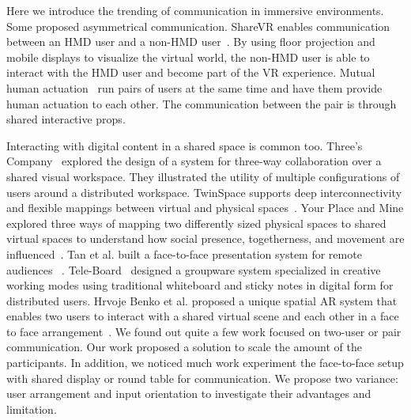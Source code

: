 \documentclass{sigchi}
\begin{document}
Here we introduce the trending of communication in immersive environments. Some proposed asymmetrical communication. ShareVR enables communication between an HMD user and a non-HMD user~\cite{gugenheimer2017sharevr}. By using floor projection and mobile displays to visualize the virtual world, the non-HMD user is able to interact with the HMD user and become part of the VR experience. Mutual human actuation~\cite{cheng2017mutual} run pairs of users at the same time and have them provide human actuation to each other. The communication between the pair is through shared interactive props.

Interacting with digital content in a shared space is common too. Three's Company~\cite{tang2010three} explored the design of a system for three-way collaboration over a shared visual workspace. They illustrated the utility of multiple configurations of users around a distributed workspace. TwinSpace supports deep interconnectivity and flexible mappings between virtual and physical spaces~\cite{reilly2010twinspace}. Your Place and Mine explored three ways of mapping two differently sized physical spaces to shared virtual spaces to understand how social presence, togetherness, and movement are influenced~\cite{sra2018}. Tan et al. built a face-to-face presentation system for remote audiences ~\cite{gazeAwareness}. Tele-Board~\cite{gumienny2011tele} designed a groupware system specialized in creative working modes using traditional whiteboard and sticky notes in digital form for distributed users. Hrvoje Benko et al. proposed a unique spatial AR system that enables two users to interact with a shared virtual scene and each other in a face to face arrangement~\cite{benko2014dyadic}. We found out quite a few work focused on two-user or pair communication. Our work proposed a solution to scale the amount of the participants. In addition, we noticed much work experiment the face-to-face setup with shared display or round table for communication. We propose two variance: user arrangement and input orientation to investigate their advantages and limitation.
\end{document}
